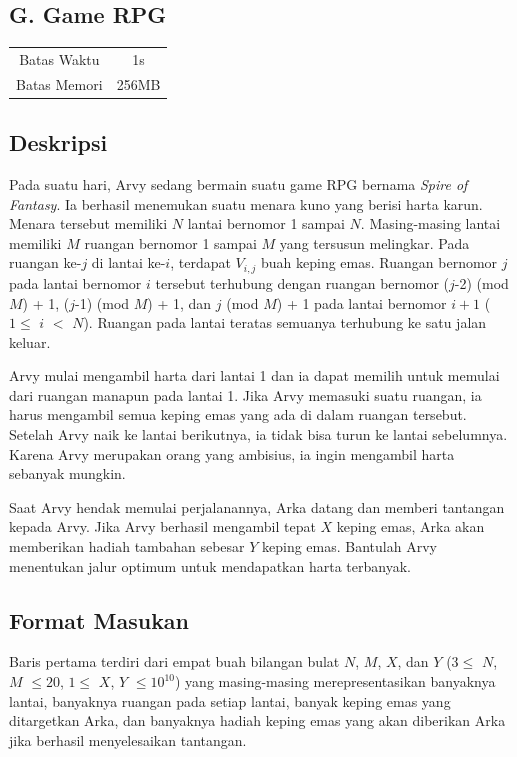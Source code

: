 \documentclass{article}
\begin{document}
\begin{center}
    \section*{G. Game RPG} %

    \begin{tabular}{ | c c | }
        \hline
        Batas Waktu  & 1s \\    %
        Batas Memori & 256MB \\  %
        \hline
    \end{tabular}
\end{center}

\subsection*{Deskripsi}
Pada suatu hari, Arvy sedang bermain suatu game RPG bernama \textit{Spire of Fantasy}. Ia berhasil menemukan suatu menara kuno yang berisi harta karun. Menara tersebut memiliki $N$ lantai bernomor 1 sampai $N$. Masing-masing lantai memiliki $M$ ruangan bernomor 1 sampai $M$ yang tersusun melingkar. Pada ruangan ke-$j$ di lantai ke-$i$, terdapat $V_{i,j}$ buah keping emas. Ruangan bernomor $j$ pada lantai bernomor $i$ tersebut terhubung dengan ruangan bernomor ($j$-2) (mod $M$) + 1, ($j$-1) (mod $M$) + 1, dan $j$ (mod $M$) + 1 pada lantai bernomor $i+1$ ($1 \leq$ $i$ $<$ $N$). Ruangan pada lantai teratas semuanya terhubung ke satu jalan keluar. 

Arvy mulai mengambil harta dari lantai 1 dan ia dapat memilih untuk memulai dari ruangan manapun pada lantai 1. Jika Arvy memasuki suatu ruangan, ia harus mengambil semua keping emas yang ada di dalam ruangan tersebut. Setelah Arvy naik ke lantai berikutnya, ia tidak bisa turun ke lantai sebelumnya. Karena Arvy merupakan orang yang ambisius, ia ingin mengambil harta sebanyak mungkin. 

Saat Arvy hendak memulai perjalanannya, Arka datang dan memberi tantangan kepada Arvy. Jika Arvy berhasil mengambil tepat $X$ keping emas, Arka akan memberikan hadiah tambahan sebesar $Y$ keping emas. Bantulah Arvy menentukan jalur optimum untuk mendapatkan harta terbanyak.

\subsection*{Format Masukan}
Baris pertama terdiri dari empat buah bilangan bulat $N$, $M$, $X$, dan $Y$  ($3 \leq$ $N$, $M$ $\leq 20$, $1 \leq$ $X$, $Y$ $\leq 10^{10}$) yang masing-masing merepresentasikan banyaknya lantai, banyaknya ruangan pada setiap lantai, banyak keping emas yang ditargetkan Arka, dan banyaknya hadiah keping emas yang akan diberikan Arka jika berhasil menyelesaikan tantangan.
\end{document}
